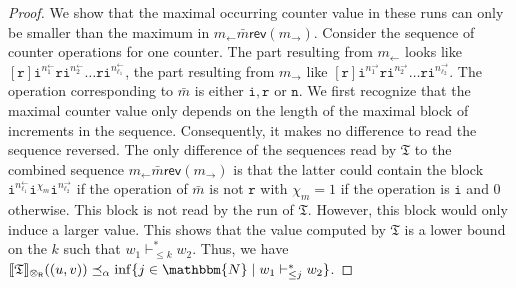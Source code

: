 \documentclass{LMCS}
\newcommand{\nat}{\mathbbm{N}}
\newcommand{\automatonT}{\mathfrak T}
\newcommand{\semantics}[1]{\llbracket#1\rrbracket}
\newcommand{\costlea}[1][\alpha]{\preceq_{#1}}
\newcommand{\configstepsLesserCost}[2][*]{\vdash^{#1}_{\le #2}}
\newcommand{\padprodR}{\otimes_{\mathsf{R}}}
\newcommand{\rl}{m_{\leftarrow}}
\newcommand{\rr}{m_{\rightarrow}}
\newcommand{\rev}{\mathsf{rev}}
\newcommand{\iOp}{\ensuremath{\mathtt{i}}}
\newcommand{\rOp}{\ensuremath{\mathtt{r}}}
\newcommand{\nOp}{\ensuremath{\mathtt{n}}}
\begin{document}
\begin{proof}
We show that the maximal occurring counter value in these runs can only be smaller than the maximum in $\rl\bar m \rev(\rr)$. Consider the sequence of counter operations for one counter. The part resulting from $\rl$ looks like $[\rOp]\iOp^{n^\leftarrow_1}\rOp\iOp^{n^\leftarrow_2}\ldots\rOp\iOp^{n^\leftarrow_{\ell_1}}$, the part resulting from $\rr$ like $[\rOp]\iOp^{n^\rightarrow_{1}}\rOp\iOp^{n^\rightarrow_2}\ldots\rOp\iOp^{n^\rightarrow_{\ell_2}}$. The operation corresponding to $\bar m$ is either $\iOp,\rOp$ or $\nOp$. We first recognize that the maximal counter value only depends on the length of the maximal block of increments in the sequence. Consequently, it makes no difference to read the sequence reversed. The only difference of the sequences read by $\automatonT$ to the combined sequence $\rl \bar m \rev(\rr)$ is that the latter could contain the block $\iOp^{n^\leftarrow_{\ell_1}}\iOp^{\chi_m}\iOp^{n^\rightarrow_{\ell_2}}$ if the operation of $\bar m$ is not $\rOp$ with $\chi_m = 1$ if the operation is $\iOp$ and $0$ otherwise. This block is not read by the run of $\automatonT$. However, this block would only induce a larger value. This shows that the value computed by $\automatonT$ is a lower bound on the $k$ such that $w_1 \configstepsLesserCost{k} w_2$. Thus, we have $\semantics{\automatonT}_{\padprodR}((u,v)) \costlea \inf \{ j \in \nat \mid  w_1 \configstepsLesserCost{j} w_2 \}$.


\end{proof}
\end{document}
